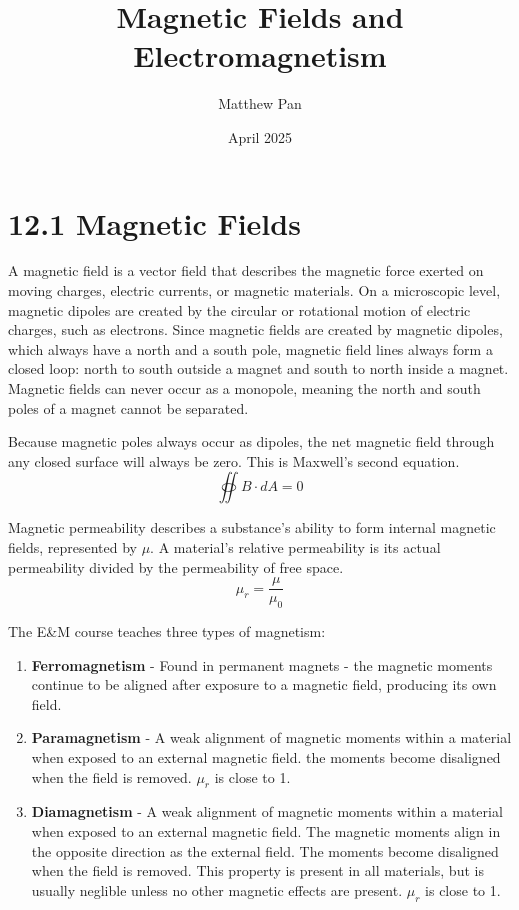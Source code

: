\documentclass[12pt, titlepage]{article}
\title{Magnetic Fields and Electromagnetism}
\author{Matthew Pan}
\date{April 2025}
\begin{document}
\pagestyle{fancy}

\fancyhead{}
\fancyhead[R]{\thepage}

\maketitle

\section*{12.1 Magnetic Fields}

A magnetic field is a vector field that describes the magnetic force exerted on moving charges, electric currents, or magnetic materials. On a microscopic level, magnetic dipoles are created by the circular or rotational motion of electric charges, such as electrons. Since magnetic fields are created by magnetic dipoles, which always have a north and a south pole, magnetic field lines always form a closed loop: north to south outside a magnet and south to north inside a magnet. Magnetic fields can never occur as a monopole, meaning the north and south poles of a magnet cannot be separated.

Because magnetic poles always occur as dipoles, the net magnetic field through any closed surface will always be zero. This is Maxwell's second equation.
\begin{equation*}
    \oiint B \cdot dA = 0
\end{equation*}

Magnetic permeability describes a substance's ability to form internal magnetic fields, represented by $\mu$. A material's relative permeability is its actual permeability divided by the permeability of free space.
\begin{equation*}
    \mu_r = \frac{\mu}{\mu_0}
\end{equation*}

The E\&M course teaches three types of magnetism:
\begin{enumerate}
    \item \textbf{Ferromagnetism} - Found in permanent magnets - the magnetic moments continue to be aligned after exposure to a magnetic field, producing its own field. 
    \item \textbf{Paramagnetism} - A weak alignment of magnetic moments within a material when exposed to an external magnetic field. the moments become disaligned when the field is removed. $\mu_r$ is close to 1.
    \item \textbf{Diamagnetism} - A weak alignment of magnetic moments within a material when exposed to an external magnetic field. The magnetic moments align in the opposite direction as the external field. The moments become disaligned when the field is removed. This property is present in all materials, but is usually neglible unless no other magnetic effects are present. $\mu_r$ is close to 1.
\end{enumerate}
\end{document}
